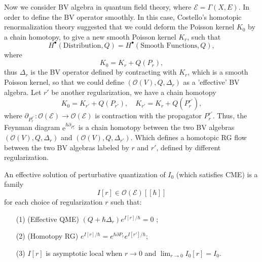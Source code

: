 \documentclass[10pt]{article}
\begin{document}
Now we consider BV algebra in quantum field theory, where $ \mathcal{E} = \Gamma(X,E)$.
In order to define the BV operator smoothly. In this case, Costello's homotopic renormalization theory suggested that we could deform the Poisson kernel $ K_0$ by a chain homotopy, to give a new smooth Poisson kernel $ K_r$, such that
\begin{equation*}
  H^{\bullet}(\text{Distribution}, Q) = H^{\bullet}(\text{Smooth Functions}, Q),
\end{equation*}
where
\begin{equation*}
  K_0 = K_r + Q(P_r),
\end{equation*}
thus $ \Delta_{r}$ is the BV operator defined by contracting with $ K_r$, which is a smooth Poisson kernel, so that we could define $\left( \mathcal{O}(V), Q, \Delta_{r} \right)$ as a 'effective' BV algebra.
Let $ r'$ be another regularization, we have a chain homotopy
\begin{equation*}
  K_0 = K_{r'} + Q(P_{r'}), \quad K_{r'} = K_{r} + Q(P_r^{r'}),
\end{equation*}
where $\partial_{P_{r}^{r'}}: \mathcal{O}(\mathcal{E}) \rightarrow \mathcal{O}(\mathcal{E})$ is contraction with the propagator $ P_{r}^{r'}$.
Thus, the Feynman diagram $ \mathrm{e}^{\hbar \partial_{P_{r}^{r'}}}$ is a chain homotopy between the two BV algebras $\left( \mathcal{O}(V), Q, \Delta_{r} \right)$ and $\left( \mathcal{O}(V), Q, \Delta_{r'} \right)$.
Which defines a homotopic RG flow between the two BV algebras labeled by $ r$ and $ r'$, defined by different regularization.
\begin{definition}
  An effective solution of perturbative quantization of $I_0$ (which satisfies CME) is a family
  \begin{equation*}
    I[r] \in \mathcal{O}(\mathcal{E})[[\hbar]]
  \end{equation*}
  for each choice of regularization $r$ such that:
  \begin{itemize}
    \item[(1)] (Effective QME) $(Q + \hbar\Delta_r) e^{I[r]/\hbar} = 0$ ;
    \item[(2)] (Homotopy RG) $e^{I[r]/\hbar} = e^{\hbar \partial P_r} e^{I[r']/\hbar}$;
    \item[(3)] $I[r]$ is asymptotic local when $r \to 0$ and $ \lim_{r \to 0} I_0[r] = I_0. $
  \end{itemize}
\end{definition}
\end{document}
